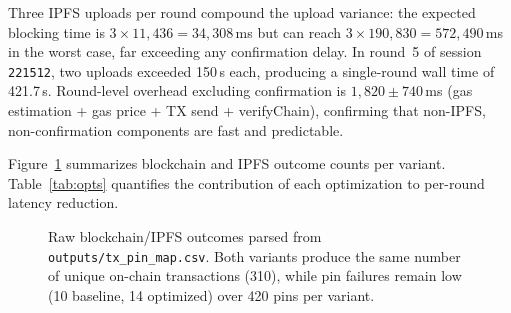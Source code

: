 \documentclass{llncs}
\begin{document}
Three IPFS uploads per round compound the upload variance: the expected
blocking time is $3{\times}11{,}436{=}34{,}308$\,ms but can reach
$3{\times}190{,}830{=}572{,}490$\,ms in the worst case, far exceeding any
confirmation delay. In round~5 of session \texttt{221512}, two uploads
exceeded 150\,s each, producing a single-round wall time of 421.7\,s.
Round-level overhead excluding confirmation is $1{,}820\pm740$\,ms
(gas estimation + gas price + TX send + verifyChain), confirming that
non-IPFS, non-confirmation components are fast and predictable.

Figure~\ref{fig:txpin_raw} summarizes blockchain and IPFS outcome counts
per variant. Table~\ref{tab:opts} quantifies the contribution of each optimization
to per-round latency reduction.

\begin{figure}[htbp]
\centering
{}
\caption{Raw blockchain/IPFS outcomes parsed from
  \texttt{outputs/tx\_pin\_map.csv}. Both variants produce the same number
  of unique on-chain transactions (310), while pin failures remain low
  (10 baseline, 14 optimized) over 420 pins per variant.}
\label{fig:txpin_raw}
\end{figure}
\end{document}
